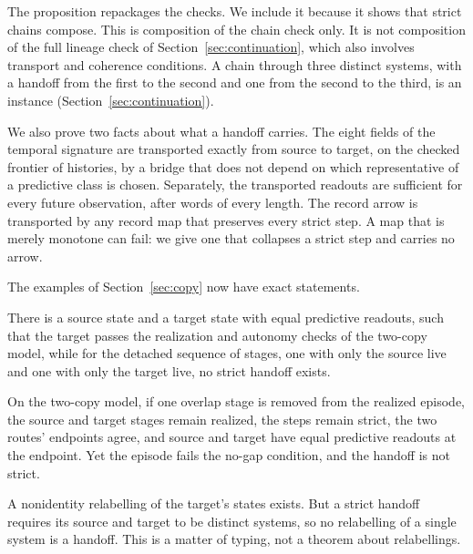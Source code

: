 The proposition repackages the checks. We include it because it shows that
strict chains compose. This is composition of the chain check only. It
is not composition of the full lineage check of Section~\ref{sec:continuation},
which also involves transport and coherence conditions. A chain through three distinct
systems, with a handoff from the first to the second and one from the second
to the third, is an instance (Section~\ref{sec:continuation}).

We also prove two facts about what a handoff carries. The eight fields of the
temporal signature are transported exactly from source to target, on the
checked frontier of histories, by a bridge that does not depend on which
representative of a predictive class is chosen. Separately, the transported
readouts are sufficient for every future observation, after words of every
length. The record arrow is transported by any record map that preserves
every strict step. A map that is merely monotone can fail: we give one that
collapses a strict step and carries no arrow.

The examples of Section~\ref{sec:copy} now have exact statements.

\begin{proposition}
\label{prop:detached}
There is a source state and a target state with equal predictive readouts,
such that the target passes the realization and autonomy checks of the
two-copy model, while for the detached sequence of stages, one with only the
source live and one with only the target live, no strict handoff exists.
\end{proposition}

\begin{proposition}[Gap]
\label{prop:gap}
On the two-copy model, if one overlap stage is removed from the realized
episode, the source and target stages remain realized, the steps remain
strict, the two routes' endpoints agree, and source and target have equal
predictive readouts at the endpoint. Yet the episode fails the no-gap
condition, and the handoff is not strict.
\end{proposition}

\begin{remark}[Re-encoding]
\label{rem:reencoding}
A nonidentity relabelling of the target's states exists. But a strict handoff
requires its source and target to be distinct systems, so no relabelling of a
single system is a handoff. This is a matter of typing, not a theorem about
relabellings.
\end{remark}

